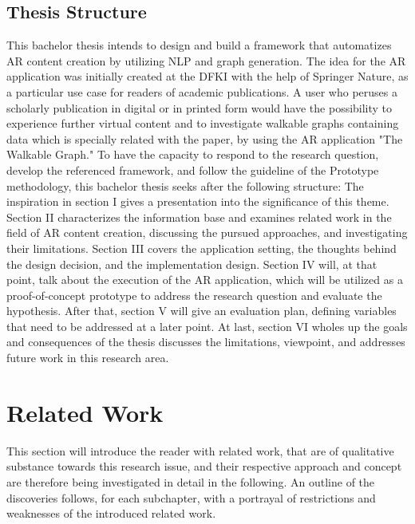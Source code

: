 \documentclass[12pt,a4paper,oneside,american,parskip=half]{article}
\begin{document}
\begin{justify}
\begin{normalsize}
\subsection{Thesis Structure}
This bachelor thesis intends to design and build a framework that automatizes AR content creation by utilizing \ac{NLP} and graph generation.
The idea for the AR application was initially created at the DFKI with the help of Springer Nature, as a particular use case for readers of academic publications. A user who peruses a scholarly publication in digital or in printed form would have the possibility to experience further virtual content and to investigate walkable graphs containing data which is specially related with the paper, by using the AR application "The Walkable Graph."
To have the capacity to respond to the research question, develop the referenced framework, and follow the guideline of the Prototype methodology, this bachelor thesis seeks after the following structure:
\newline
The inspiration in section I gives a presentation into the significance of this theme. Section II characterizes the information base and examines related work in the field of AR content creation, discussing the pursued approaches, and investigating their limitations. Section III covers the application setting, the thoughts behind the design decision, and the implementation design.
\newline
Section IV will, at that point, talk about the execution of the AR application, which will be utilized as a proof-of-concept prototype to address the research question and evaluate the hypothesis.
\newline
After that, section V will give an evaluation plan, defining variables that need to be addressed at a later point. At last, section VI wholes up the goals and consequences of the thesis discusses the limitations, viewpoint, and addresses future work in this research area.
\clearpage


\section{Related Work}
This section will introduce the reader with related work, that are of qualitative substance towards this research issue, and their respective approach and concept are therefore being investigated in detail in the following.
An outline of the discoveries follows, for each subchapter, with a portrayal of restrictions and weaknesses of the introduced related work.


\end{normalsize}
\end{justify}
\end{document}
